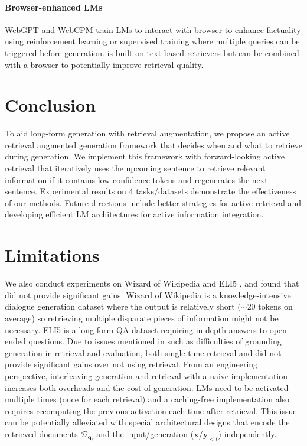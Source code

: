 \paragraph{Browser-enhanced LMs} WebGPT \cite{webgpt-nakano-2021} and WebCPM \cite{webcpm-qin-2023} train LMs to interact with browser to enhance factuality using reinforcement learning or supervised training where multiple queries can be triggered before generation.
\ours is built on text-based retrievers but can be combined with a browser to potentially improve retrieval quality.

\section{Conclusion}
To aid long-form generation with retrieval augmentation, we propose an active retrieval augmented generation framework that decides when and what to retrieve during generation.
We implement this framework with forward-looking active retrieval that iteratively uses the upcoming sentence to retrieve relevant information if it contains low-confidence tokens and regenerates the next sentence.
Experimental results on 4 tasks/datasets demonstrate the effectiveness of our methods.
Future directions include better strategies for active retrieval and developing efficient LM architectures for active information integration.

\section{Limitations}\label{sec:limit}
We also conduct experiments on Wizard of Wikipedia \cite{wow-dinan-2019} and ELI5 \cite{eli5-fan-2019}, and found that \ours did not provide significant gains.
Wizard of Wikipedia is a knowledge-intensive dialogue generation dataset where the output is relatively short ($\sim$20 tokens on average) so retrieving multiple disparate pieces of information might not be necessary.
ELI5 \cite{eli5-fan-2019} is a long-form QA dataset requiring in-depth answers to open-ended questions.
Due to issues mentioned in \citet{hurdle-krishna-2021} such as difficulties of grounding generation in retrieval and evaluation, both single-time retrieval and \ours did not provide significant gains over not using retrieval.
From an engineering perspective, interleaving generation and retrieval with a naive implementation increases both overheads and the cost of generation.
LMs need to be activated multiple times (once for each retrieval) and a caching-free implementation also requires recomputing the previous activation each time after retrieval.
This issue can be potentially alleviated with special architectural designs that encode the retrieved documents $\mathcal{D}_{\bm{q}_t}$ and the input/generation ($\bm{x}$/$\bm{y}_{<t}$) independently.

